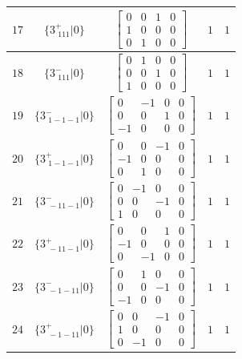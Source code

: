 \documentclass[fleqn,8pt]{jsarticle}
\begin{document}
\begin{longtable}{ccccc}
$ 17 $ & $ \{3^{+}_{\,\,111}|0\} $ & $ \begin{bmatrix} 0 & 0 & 1 & 0 \\ 1 & 0 & 0 & 0 \\ 0 & 1 & 0 & 0 \end{bmatrix} $ & $ 1 $ & $ 1 $ \\ \hline
$ 18 $ & $ \{3^{-}_{\,\,111}|0\} $ & $ \begin{bmatrix} 0 & 1 & 0 & 0 \\ 0 & 0 & 1 & 0 \\ 1 & 0 & 0 & 0 \end{bmatrix} $ & $ 1 $ & $ 1 $ \\ \hline
$ 19 $ & $ \{3^{-}_{\,\,1-1-1}|0\} $ & $ \begin{bmatrix} 0 & -1 & 0 & 0 \\ 0 & 0 & 1 & 0 \\ -1 & 0 & 0 & 0 \end{bmatrix} $ & $ 1 $ & $ 1 $ \\ \hline
$ 20 $ & $ \{3^{+}_{\,\,1-1-1}|0\} $ & $ \begin{bmatrix} 0 & 0 & -1 & 0 \\ -1 & 0 & 0 & 0 \\ 0 & 1 & 0 & 0 \end{bmatrix} $ & $ 1 $ & $ 1 $ \\ \hline
$ 21 $ & $ \{3^{-}_{\,\,-11-1}|0\} $ & $ \begin{bmatrix} 0 & -1 & 0 & 0 \\ 0 & 0 & -1 & 0 \\ 1 & 0 & 0 & 0 \end{bmatrix} $ & $ 1 $ & $ 1 $ \\ \hline
$ 22 $ & $ \{3^{+}_{\,\,-11-1}|0\} $ & $ \begin{bmatrix} 0 & 0 & 1 & 0 \\ -1 & 0 & 0 & 0 \\ 0 & -1 & 0 & 0 \end{bmatrix} $ & $ 1 $ & $ 1 $ \\ \hline
$ 23 $ & $ \{3^{-}_{\,\,-1-11}|0\} $ & $ \begin{bmatrix} 0 & 1 & 0 & 0 \\ 0 & 0 & -1 & 0 \\ -1 & 0 & 0 & 0 \end{bmatrix} $ & $ 1 $ & $ 1 $ \\ \hline
$ 24 $ & $ \{3^{+}_{\,\,-1-11}|0\} $ & $ \begin{bmatrix} 0 & 0 & -1 & 0 \\ 1 & 0 & 0 & 0 \\ 0 & -1 & 0 & 0 \end{bmatrix} $ & $ 1 $ & $ 1 $ \\ \hline

\end{longtable}
\end{document}
